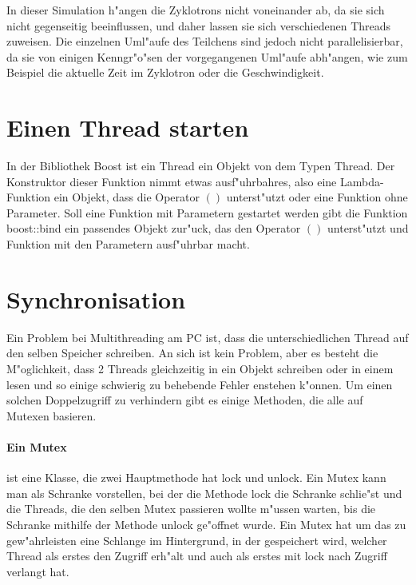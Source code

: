 \documentclass[14pt, a4paper]{report}
\begin{document}
In dieser Simulation h"angen die Zyklotrons nicht voneinander ab, da sie sich nicht
gegenseitig beeinflussen, und daher lassen sie sich verschiedenen Threads zuweisen. Die
einzelnen Uml"aufe des Teilchens sind jedoch nicht parallelisierbar, da sie von einigen
Kenngr"o"sen der vorgegangenen Uml"aufe abh"angen, wie zum Beispiel die aktuelle Zeit 
im Zyklotron oder die Geschwindigkeit.

\section{Einen Thread starten}
In der Bibliothek Boost ist ein Thread ein Objekt von dem Typen Thread. Der
Konstruktor dieser Funktion nimmt etwas ausf"uhrbahres, also eine Lambda-Funktion
ein Objekt, dass die Operator $()$ unterst"utzt oder eine Funktion ohne Parameter.
Soll eine Funktion mit Parametern gestartet werden gibt die Funktion boost::bind ein
passendes Objekt zur"uck, das den Operator $()$ unterst"utzt und Funktion mit den
Parametern ausf"uhrbar macht.

\section{Synchronisation} \label{Synchronisation}
Ein Problem bei Multithreading am PC ist, dass die unterschiedlichen Thread auf den
selben Speicher schreiben. An sich ist kein Problem, aber es besteht die M"oglichkeit,
dass 2 Threads gleichzeitig in ein Objekt schreiben oder in einem lesen und so einige
schwierig zu behebende Fehler enstehen k"onnen. Um einen solchen Doppelzugriff zu 
verhindern gibt es einige Methoden, die alle auf Mutexen basieren.

\paragraph{Ein Mutex} ist eine Klasse, die zwei Hauptmethode hat lock und unlock. Ein
Mutex kann man als Schranke vorstellen, bei der die Methode lock die Schranke schlie"st
und die Threads, die den selben Mutex passieren wollte m"ussen warten, bis die Schranke
mithilfe der Methode unlock ge"offnet wurde. Ein Mutex hat um das zu gew"ahrleisten eine
Schlange im Hintergrund, in der gespeichert wird, welcher Thread als erstes den Zugriff
erh"alt und auch als erstes mit lock nach Zugriff verlangt hat. 
\end{document}
